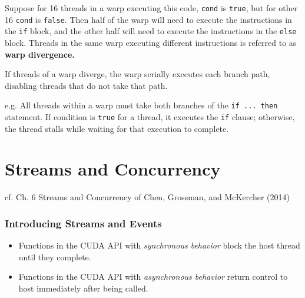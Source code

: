 \documentclass[10pt]{amsart}
\begin{document}
\begin{multicols*}{2}
Suppose for 16 threads in a warp executing this code, \verb|cond| is \verb|true|, but for other 16 \verb|cond| is \verb|false|.  Then half of the warp will need to execute the instructions in the \verb|if| block, and the other half will need to execute the instructions in the \verb|else| block.  Threads in the same warp executing different instructions is referred to as \textbf{warp divergence.} 

If threads of a warp diverge, the warp serially executes each branch path, disabling threads that do not take that path.  

e.g. All threads within a warp must take both branches of the \verb|if ... then| statement.  If condition is \verb|true| for a thread, it executes the \verb|if| clause; otherwise, the thread stalls while waiting for that execution to complete.  




\section{Streams and Concurrency}  
cf. Ch. 6 Streams and Concurrency of  Chen, Grossman, and McKercher (2014) \cite{CGM2014}
\subsubsection{Introducing Streams and Events}
\begin{itemize}
	\item Functions in the CUDA API with \emph{synchronous behavior} block the host thread until they complete.  
	\item Functions in the CUDA API with \emph{asynchronous behavior} return control to host immediately after being called.  
\end{itemize}  

\end{multicols*}
\end{document}
